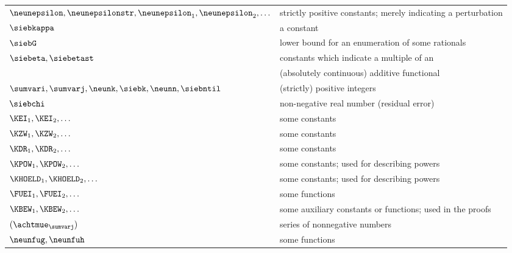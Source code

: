 \begin{longtable}{ll}

$\neunepsilon,\neunepsilonstr,\neunepsilon_{1},\neunepsilon_{2}, \ldots$ & strictly positive constants; merely indicating a  perturbation 
\\
$\siebkappa$ &  a constant
\\
$\siebG$ & lower bound for  an enumeration of some rationals
\\
$\siebeta,\siebetast$ & constants which indicate a multiple of an  
\\
$\ $ & (absolutely continuous) additive functional
\\
$\sumvari,\sumvarj,\neunk,\siebk,\neunn,\siebntil$ & (strictly) positive integers
\\
$\siebchi$ & non-negative real number (residual error) 
\\
$\KEI_{1}, \KEI_{2}, \ldots$ &  some constants 
\\
$\KZW_{1}, \KZW_{2}, \ldots$ & some constants 
\\
$\KDR_{1}, \KDR_{2}, \ldots$ & some constants 
\\
$\KPOW_{1}, \KPOW_{2}, \ldots$ & some constants; used for describing powers
\\
$\KHOELD_{1},\KHOELD_{2}, \ldots$ & some constants; used for describing powers  
\\
$\FUEI_{1}, \FUEI_{2}, \ldots$ & some functions 
\\
$\KBEW_{1}, \KBEW_{2}, \ldots$ & some  auxiliary constants or functions;  used in the proofs
\\
$({\achtmue}_{\sumvarj})$ & series of nonnegative numbers
\\
$\neunfug,\neunfuh$ & some functions
\\
 
\end{longtable}








